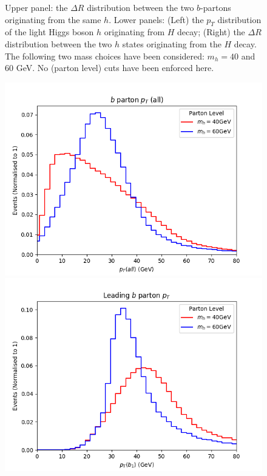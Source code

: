 \documentclass[12pt]{article}
\begin{document}
\begin{figure}[htb!]
\begin{center}
	 \end{center}
	\caption{Upper panel: the $\Delta R$ distribution between the
two $b$-partons originating from the same $h$. Lower panels: (Left)
the $p_T$ distribution of the light Higgs boson $h$ originating from $H$ decay;
(Right) the $\Delta R$ distribution between the two $h$ states originating from the
$H$ decay. The following two mass choices have been considered: $m_h=40$ and 60 GeV. No (parton level) cuts have been enforced here. }
\label{fig:parton_higgs}
\end{figure}

\begin{figure}[htb!]
	\begin{center}
	\includegraphics[scale=0.42]{plots/parton/b_pt.png}\\
	\includegraphics[scale=0.42]{plots/parton/b1_pt.png}

\end{center}
\end{figure}
\end{document}
